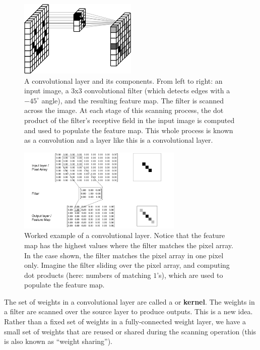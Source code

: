 \begin{figure}[h]
\centering
\includegraphics[width=0.5\textwidth]{images/happyConvolution.png}
\caption[Soraya Boza, adapting this image from User Cecbur, \url{https://commons.wikimedia.org/wiki/File:Convolutional_Neural_Network_NeuralNetworkFilter.gif}, with labels added by Jeff Yoshimi.]{A convolutional layer and its components. From left to right: an input image, a 3x3 convolutional filter (which detects edges with a $-45^\circ$ angle), and the resulting feature map. The filter is scanned across the image. At each stage of this scanning process, the dot product of the filter's receptive field in the input image is computed and used to populate the feature map. This whole process is known as a convolution and a layer like this is a convolutional layer.}
\label{cnn_filter}
\end{figure}

\begin{figure}[h]
\centering
\includegraphics[width=0.7\textwidth]{images/CNN_WorkedExample.png}
\caption[Jeff Yoshimi]{Worked example of a convolutional layer. Notice that the feature map has the highest values where the filter matches the pixel array. In the case shown, the filter matches the pixel array in one pixel only. Imagine the filter sliding over the pixel array, and computing dot products (here: numbers of matching $1$'s), which are used to populate the feature map.}
\label{cnn_workedExample}
\end{figure}

The set of weights in a convolutional layer are called a  or \textbf{kernel}. The weights in a filter are scanned over the source layer to produce outputs. This is a new idea. Rather than a fixed set of weights in a fully-connected weight layer, we have a small set of weights that are reused or shared during the scanning operation (this is also known as ``weight sharing'').

